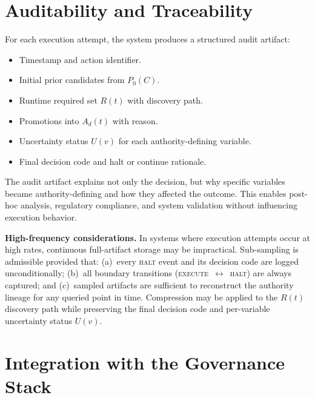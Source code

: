 \documentclass[11pt]{article}
\begin{document}
\section{Auditability and Traceability}

For each execution attempt, the system produces a structured audit artifact:

\begin{itemize}
  \item Timestamp and action identifier.
  \item Initial prior candidates from $P_0(C)$.
  \item Runtime required set $R(t)$ with discovery path.
  \item Promotions into $A_d(t)$ with reason.
  \item Uncertainty status $U(v)$ for each authority-defining variable.
  \item Final decision code and halt or continue rationale.
\end{itemize}

The audit artifact explains not only the decision, but why specific variables became
authority-defining and how they affected the outcome. This enables post-hoc analysis,
regulatory compliance, and system validation without influencing execution behavior.

\textbf{High-frequency considerations.} In systems where execution attempts occur at high
rates, continuous full-artifact storage may be impractical. Sub-sampling is admissible
provided that: (a)~every \textsc{halt} event and its decision code are logged
unconditionally; (b)~all boundary transitions (\textsc{execute}~$\leftrightarrow$~\textsc{halt})
are always captured; and (c)~sampled artifacts are sufficient to reconstruct the authority
lineage for any queried point in time. Compression may be applied to the $R(t)$ discovery
path while preserving the final decision code and per-variable uncertainty status
$U(v)$.

\section{Integration with the Governance Stack}
\end{document}
